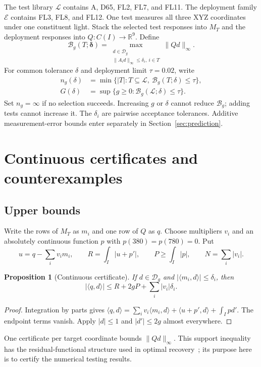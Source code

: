\documentclass{optica-article}
\newtheorem{proposition}[theorem]{Proposition}
\newcommand{\Dg}{\mathcal D_g}
\newcommand{\B}{\mathcal B}
\newcommand{\ip}[2]{\langle #1,#2\rangle}
\newcommand{\norm}[1]{\lVert#1\rVert}
\begin{document}
The test library $\mathcal L$ contains A, D65, FL2, FL7, and FL11. The deployment family $\mathcal E$ contains FL3, FL8, and FL12. One test measures all three XYZ coordinates under one constituent light. Stack the selected test responses into $M_T$ and the deployment responses into $Q:C(I)\to\mathbb R^9$. Define
\begin{equation}
 \B_g(T;\boldsymbol\delta)=
 \max_{\substack{d\in\Dg\\\norm{A_i d}_\infty\leq\delta_i,\ i\in T}}
       \norm{Qd}_\infty.                                \label{eq:B}
\end{equation}
For common tolerance $\delta$ and deployment limit $\tau=0.02$, write
\begin{align}
 n_g(\delta)&=\min\{|T|:T\subseteq\mathcal L,\ \B_g(T;\delta)\leq\tau\},\nonumber\\
 G(\delta)&=\sup\{g\geq0:\B_g(\mathcal L;\delta)\leq\tau\}. \label{eq:countG}
\end{align}
Set $n_g=\infty$ if no selection succeeds. Increasing $g$ or $\delta$ cannot reduce $\B_g$; adding tests cannot increase it. The $\delta_i$ are pairwise acceptance tolerances. Additive measurement-error bounds enter separately in Section~\ref{sec:prediction}.

\section{Continuous certificates and counterexamples}
\subsection{Upper bounds}
Write the rows of $M_T$ as $m_i$ and one row of $Q$ as $q$. Choose multipliers $v_i$ and an absolutely continuous function $p$ with $p(380)=p(780)=0$. Put
\begin{equation}
 u=q-\sum_i v_i m_i,\qquad R=\int_I|u+p'|,\qquad
 P\geq\int_I|p|,\qquad N=\sum_i|v_i|.                    \label{eq:certificate}
\end{equation}
\begin{proposition}[Continuous certificate]\label{prop:dual}
If $d\in\Dg$ and $|\ip{m_i}d|\leq\delta_i$, then
\begin{equation}
 |\ip qd|\leq R+2gP+\sum_i|v_i|\delta_i.                 \label{eq:dual}
\end{equation}
\end{proposition}
\begin{proof}
Integration by parts gives
$\ip qd=\sum_i v_i\ip{m_i}d+\ip{u+p'}d+\int_I p d'$.
The endpoint terms vanish. Apply $|d|\leq1$ and $|d'|\leq2g$ almost everywhere.
\end{proof}
One certificate per target coordinate bounds $\norm{Qd}_\infty$. This support inequality has the residual-functional structure used in optimal recovery~\cite{foucart,ettehad}; its purpose here is to certify the numerical testing results.
\end{document}
